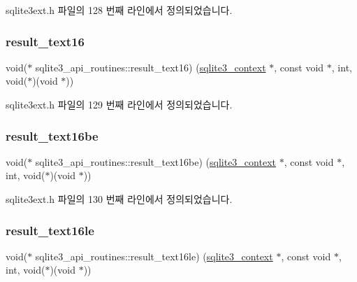 sqlite3ext.\+h 파일의 128 번째 라인에서 정의되었습니다.

\mbox{\label{structsqlite3__api__routines_ac7d4e41cae34faec587e871f91a0691d}} 
\subsubsection{\texorpdfstring{result\+\_\+text16}{result\_text16}}
{\footnotesize\ttfamily void($\ast$ sqlite3\+\_\+api\+\_\+routines\+::result\+\_\+text16) (\hyperlink{sqlite3_8h_a3b519553ffec8fc42b2356f5b1ebdc57}{sqlite3\+\_\+context} $\ast$, const void $\ast$, int, void($\ast$)(void $\ast$))}



sqlite3ext.\+h 파일의 129 번째 라인에서 정의되었습니다.

\mbox{\label{structsqlite3__api__routines_a953fc695bbec79fc5999bc9f2a0c94f3}} 
\subsubsection{\texorpdfstring{result\+\_\+text16be}{result\_text16be}}
{\footnotesize\ttfamily void($\ast$ sqlite3\+\_\+api\+\_\+routines\+::result\+\_\+text16be) (\hyperlink{sqlite3_8h_a3b519553ffec8fc42b2356f5b1ebdc57}{sqlite3\+\_\+context} $\ast$, const void $\ast$, int, void($\ast$)(void $\ast$))}



sqlite3ext.\+h 파일의 130 번째 라인에서 정의되었습니다.

\mbox{\label{structsqlite3__api__routines_a6607ea8847a57d49bdf450205f4d580f}} 
\subsubsection{\texorpdfstring{result\+\_\+text16le}{result\_text16le}}
{\footnotesize\ttfamily void($\ast$ sqlite3\+\_\+api\+\_\+routines\+::result\+\_\+text16le) (\hyperlink{sqlite3_8h_a3b519553ffec8fc42b2356f5b1ebdc57}{sqlite3\+\_\+context} $\ast$, const void $\ast$, int, void($\ast$)(void $\ast$))}



